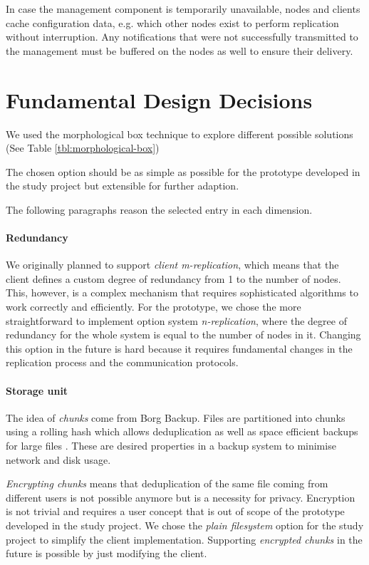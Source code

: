 In case the \gls{management} component is temporarily unavailable, \glspl{node} and \glspl{client} cache configuration data, e.g. which other \glspl{node} exist to perform replication without interruption. Any notifications that were not successfully transmitted to the \gls{management} must be buffered on the \glspl{node} as well to ensure their delivery.

\section{Fundamental Design Decisions}\label{sec:fundamental-design-decisions}

We used the morphological box technique to explore different possible solutions (See Table \ref{tbl:morphological-box})

The chosen option should be as simple as possible for the prototype developed in the study project but extensible for further adaption.

The following paragraphs reason the selected entry in each dimension.

\paragraph{Redundancy}
We originally planned to support \emph{client m-replication}, which means that the client defines a custom degree of redundancy from 1 to the number of nodes. This, however, is a complex mechanism that requires sophisticated algorithms to work correctly and efficiently. For the prototype, we chose the more straightforward to implement option system \emph{n-replication}, where the degree of redundancy for the whole system is equal to the number of nodes in it. Changing this option in the future is hard because it requires fundamental changes in the replication process and the communication protocols.

\paragraph{Storage unit}
The idea of \emph{chunks} come from Borg Backup. Files are partitioned into chunks using a rolling hash which allows deduplication as well as space efficient backups for large files \cite{borg-data-structures}. These are desired properties in a backup system to minimise network and disk usage.

\emph{Encrypting chunks} means that deduplication of the same file coming from different users is not possible anymore but is a necessity for privacy. Encryption is not trivial and requires a user concept that is out of scope of the prototype developed in the study project.
We chose the \emph{plain filesystem} option for the study project to simplify the client implementation. Supporting \emph{encrypted chunks} in the future is possible by just modifying the client.

